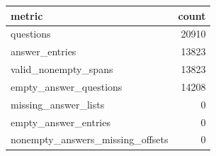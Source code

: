 \begin{tabular}{lr}
\toprule
metric & count \\
\midrule
questions & 20910 \\
answer\_entries & 13823 \\
valid\_nonempty\_spans & 13823 \\
empty\_answer\_questions & 14208 \\
missing\_answer\_lists & 0 \\
empty\_answer\_entries & 0 \\
nonempty\_answers\_missing\_offsets & 0 \\
\bottomrule
\end{tabular}
